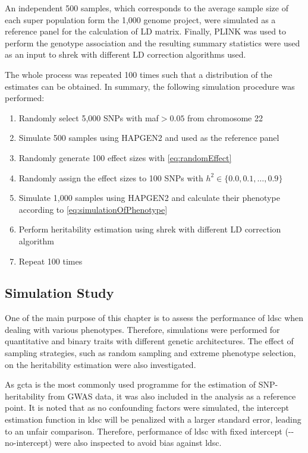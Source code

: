 \documentclass[12pt]{scrbook}
\begin{document}
An independent 500 samples, which corresponds to the average sample size of each super population form the 1,000 genome project, were simulated as a reference panel for the calculation of \gls{LD} matrix.
Finally, PLINK \citep{Purcell2007} was used to perform the genotype association and the resulting summary statistics were used as an input to \gls{shrek} with different \gls{LD} correction algorithms used.

The whole process was repeated 100 times such that a distribution of the estimates can be obtained. 
In summary, the following simulation procedure was performed:
\begin{enumerate}
	\item Randomly select 5,000 \glspl{SNP} with \gls{maf}$>0.05$ from chromosome 22
	\item Simulate 500 samples using HAPGEN2 and used as the reference panel
	\item Randomly generate 100 effect sizes with \cref{eq:randomEffect}
	\item Randomly assign the effect sizes to 100 \glspl{SNP} with $h^2\in\{0.0,0.1,\dots,0.9\}$
	\item Simulate 1,000 samples using HAPGEN2 and calculate their phenotype according to \cref{eq:simulationOfPhenotype} 
	\item Perform heritability estimation using \gls{shrek} with different \gls{LD} correction algorithm
	\item Repeat 100 times
\end{enumerate}

\subsection{Simulation Study}
One of the main purpose of this chapter is to assess the performance of \gls{ldsc} when dealing with various phenotypes. 
Therefore, simulations were performed for quantitative and binary traits with different genetic architectures. 
The effect of sampling strategies, such as random sampling and extreme phenotype selection, on the heritability estimation were also investigated.

As \gls{gcta} \citep{Yang2011} is the most commonly used programme for the estimation of \gls{SNP}-heritability from \gls{GWAS} data, it was also included in the analysis as a reference point. 
It is noted that as no confounding factors were simulated, the intercept estimation function in \gls{ldsc} will be penalized with a larger standard error, leading to an unfair comparison. 
Therefore, performance of \gls{ldsc} with fixed intercept (-{}-no-intercept) were also inspected to avoid bias against \gls{ldsc}.
\end{document}

